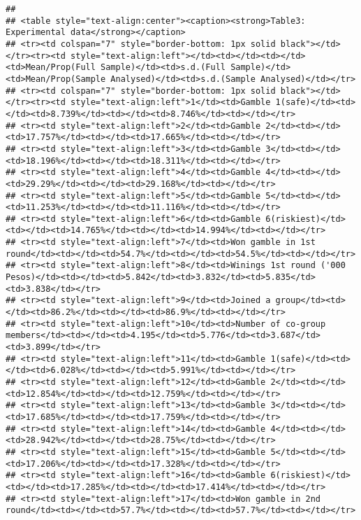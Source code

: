 \documentclass[]{article}
\begin{document}
\begin{verbatim}
## 
## <table style="text-align:center"><caption><strong>Table3: Experimental data</strong></caption>
## <tr><td colspan="7" style="border-bottom: 1px solid black"></td></tr><tr><td style="text-align:left"></td><td></td><td></td><td>Mean/Prop(Full Sample)</td><td>s.d.(Full Sample)</td><td>Mean/Prop(Sample Analysed)</td><td>s.d.(Sample Analysed)</td></tr>
## <tr><td colspan="7" style="border-bottom: 1px solid black"></td></tr><tr><td style="text-align:left">1</td><td>Gamble 1(safe)</td><td></td><td>8.739%</td><td></td><td>8.746%</td><td></td></tr>
## <tr><td style="text-align:left">2</td><td>Gamble 2</td><td></td><td>17.757%</td><td></td><td>17.665%</td><td></td></tr>
## <tr><td style="text-align:left">3</td><td>Gamble 3</td><td></td><td>18.196%</td><td></td><td>18.311%</td><td></td></tr>
## <tr><td style="text-align:left">4</td><td>Gamble 4</td><td></td><td>29.29%</td><td></td><td>29.168%</td><td></td></tr>
## <tr><td style="text-align:left">5</td><td>Gamble 5</td><td></td><td>11.253%</td><td></td><td>11.116%</td><td></td></tr>
## <tr><td style="text-align:left">6</td><td>Gamble 6(riskiest)</td><td></td><td>14.765%</td><td></td><td>14.994%</td><td></td></tr>
## <tr><td style="text-align:left">7</td><td>Won gamble in 1st round</td><td></td><td>54.7%</td><td></td><td>54.5%</td><td></td></tr>
## <tr><td style="text-align:left">8</td><td>Winings 1st round ('000 Pesos)</td><td></td><td>5.842</td><td>3.832</td><td>5.835</td><td>3.838</td></tr>
## <tr><td style="text-align:left">9</td><td>Joined a group</td><td></td><td>86.2%</td><td></td><td>86.9%</td><td></td></tr>
## <tr><td style="text-align:left">10</td><td>Number of co-group members</td><td></td><td>4.195</td><td>5.776</td><td>3.687</td><td>3.899</td></tr>
## <tr><td style="text-align:left">11</td><td>Gamble 1(safe)</td><td></td><td>6.028%</td><td></td><td>5.991%</td><td></td></tr>
## <tr><td style="text-align:left">12</td><td>Gamble 2</td><td></td><td>12.854%</td><td></td><td>12.759%</td><td></td></tr>
## <tr><td style="text-align:left">13</td><td>Gamble 3</td><td></td><td>17.685%</td><td></td><td>17.759%</td><td></td></tr>
## <tr><td style="text-align:left">14</td><td>Gamble 4</td><td></td><td>28.942%</td><td></td><td>28.75%</td><td></td></tr>
## <tr><td style="text-align:left">15</td><td>Gamble 5</td><td></td><td>17.206%</td><td></td><td>17.328%</td><td></td></tr>
## <tr><td style="text-align:left">16</td><td>Gamble 6(riskiest)</td><td></td><td>17.285%</td><td></td><td>17.414%</td><td></td></tr>
## <tr><td style="text-align:left">17</td><td>Won gamble in 2nd round</td><td></td><td>57.7%</td><td></td><td>57.7%</td><td></td></tr>

\end{verbatim}
\end{document}
